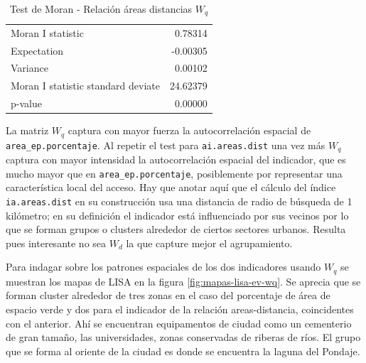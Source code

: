 \documentclass[12pt,]{book}
\begin{document}
\begin{table}

\caption{\label{tab:moran-areadist-wq}Test de Moran - Relación áreas distancias $W_q$}
\centering
\begin{tabular}[t]{lr}
\toprule
  &  \\
\midrule
Moran I statistic & 0.78314\\
Expectation & -0.00305\\
Variance & 0.00102\\
Moran I statistic standard deviate & 24.62379\\
p-value & 0.00000\\
\bottomrule
\end{tabular}
\end{table}

La matriz \(W_q\) captura con mayor fuerza la autocorrelación espacial
de \texttt{area\_ep.porcentaje}. Al repetir el test para
\texttt{ai.areas.dist} una vez más \(W_q\) captura con mayor intensidad
la autocorrelación espacial del indicador, que es mucho mayor que en
\texttt{area\_ep.porcentaje}, posiblemente por representar una
característica local del acceso. Hay que anotar aquí que el cálculo del
índice \texttt{ia.areas.dist} en su construcción usa una distancia de
radio de búsqueda de 1 kilómetro; en su definición el indicador está
influenciado por sus vecinos por lo que se forman grupos o clusters
alrededor de ciertos sectores urbanos. Resulta pues interesante no sea
\(W_d\) la que capture mejor el agrupamiento.

Para indagar sobre los patrones espaciales de los dos indicadores usando
\(W_q\) se muestran los mapas de LISA en la figura
\ref{fig:mapas-lisa-ev-wq}. Se aprecia que se forman cluster alrededor
de tres zonas en el caso del porcentaje de área de espacio verde y dos
para el indicador de la relación areas-distancia, coincidentes con el
anterior. Ahí se encuentran equipamentos de ciudad como un cementerio de
gran tamaño, las universidades, zonas conservadas de riberas de ríos. El
grupo que se forma al oriente de la ciudad es donde se encuentra la
laguna del Pondaje.
\end{document}
